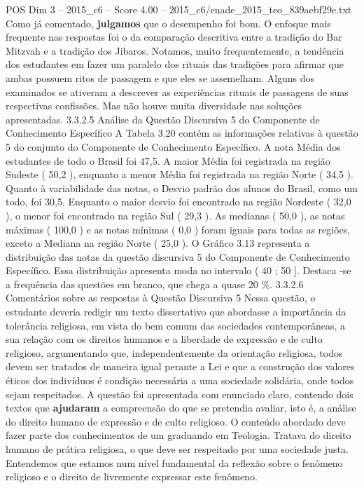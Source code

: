 \begin{textsample}{POS Dim 3 – 2015\_c6 – Score 4.00 – 2015\_c6/enade\_2015\_teo\_839aebf29e.txt}
Como já comentado, \textbf{julgamos} que o desempenho foi bom.
O enfoque mais frequente nas respostas foi o da comparação descritiva entre a tradição do Bar Mitzvah e a tradição dos Jibaros.
Notamos, muito frequentemente, a tendência dos estudantes em fazer um paralelo dos rituais das tradições para afirmar que ambas possuem ritos de passagem e que eles se assemelham.
Alguns dos examinados se ativeram a descrever as experiências rituais de passagens de suas respectivas confissões.
Mas não houve muita diversidade nas soluções apresentadas. 3.3.2.5 Análise da Questão Discursiva 5 do Componente de Conhecimento Específico A Tabela 3.20 contém as informações relativas à questão 5 do conjunto do Componente de Conhecimento Específico.
A nota Média dos estudantes de todo o Brasil foi 47,5.
A maior Média foi registrada na região Sudeste ( 50,2 ), enquanto a menor Média foi registrada na região Norte ( 34,5 ).
Quanto à variabilidade das notas, o Desvio padrão dos alunos do Brasil, como um todo, foi 30,5.
Enquanto o maior desvio foi encontrado na região Nordeste ( 32,0 ), o menor foi encontrado na região Sul ( 29,3 ).
As medianas ( 50,0 ), as notas máximas ( 100,0 ) e as notas mínimas ( 0,0 ) foram iguais para todas as regiões, exceto a Mediana na região Norte ( 25,0 ).
O Gráfico 3.13 representa a distribuição das notas da questão discursiva 5 do Componente de Conhecimento Específico.
Essa distribuição apresenta moda no intervalo ( 40 ; 50 ].
Destaca -se a frequência das questões em branco, que chega a quase 20 \%. 3.3.2.6 Comentários sobre as respostas à Questão Discursiva 5 Nessa questão, o estudante deveria redigir um texto dissertativo que abordasse a importância da tolerância religiosa, em vista do bem comum das sociedades contemporâneas, a sua relação com os direitos humanos e a liberdade de expressão e de culto religioso, argumentando que, independentemente da orientação religiosa, todos devem ser tratados de maneira igual perante a Lei e que a construção dos valores éticos dos indivíduos é condição necessária a uma sociedade solidária, onde todos sejam respeitados.
A questão foi apresentada com enunciado claro, contendo dois textos que \textbf{ajudaram} a compreensão do que se pretendia avaliar, isto é, a análise do direito humano de expressão e de culto religioso.
O conteúdo abordado deve fazer parte dos conhecimentos de um graduando em Teologia.
Tratava do direito humano de prática religiosa, o que deve ser respeitado por uma sociedade justa.
Entendemos que estamos num nível fundamental da reflexão sobre o fenômeno religioso e o direito de livremente expressar este fenômeno.

\end{textsample}
